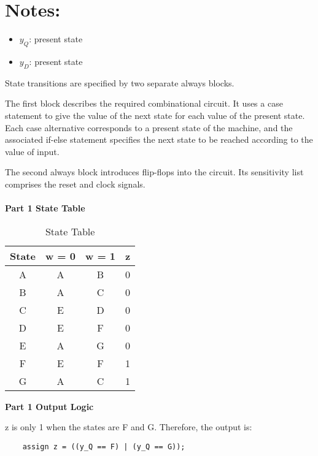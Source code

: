 \documentclass{article}
\begin{document}
\section*{Notes:}
\begin{itemize}
    \item $y_Q$: present state
    \item $y_D$: present state
\end{itemize}

State transitions are specified by two separate always blocks. 

The first block describes the required combinational circuit. It uses a case statement to give the value of the next state for each value of the present state. Each case alternative corresponds to a present state of the machine, and the associated if-else statement specifies the next state to be reached according to the value of input.

The second always block introduces flip-flops into the circuit. Its sensitivity list comprises the reset and clock signals.
\\
\\
\textbf{Part 1 State Table}

\begin{table}[ht]
    \centering
    \caption{State Table}
    \label{tab:state-table}
    \begin{tabular}{|c|c|c|c|}
    \hline
    \textbf{State} & \textbf{w = 0} & \textbf{w = 1} & \textbf{z} \\
    \hline
    A & A & B & 0\\
    \hline
    B & A & C & 0\\
    \hline
    C & E & D & 0\\
    \hline
    D & E & F & 0\\
    \hline
    E & A & G & 0\\
    \hline
    F & E & F & 1\\
    \hline
    G & A & C & 1\\

    \hline
    \end{tabular}
    \end{table}
\noindent\textbf{Part 1 Output Logic}

z is only 1 when the states are F and G. Therefore, the output is:

\begin{verbatim}
    assign z = ((y_Q == F) | (y_Q == G));
\end{verbatim}
\end{document}
